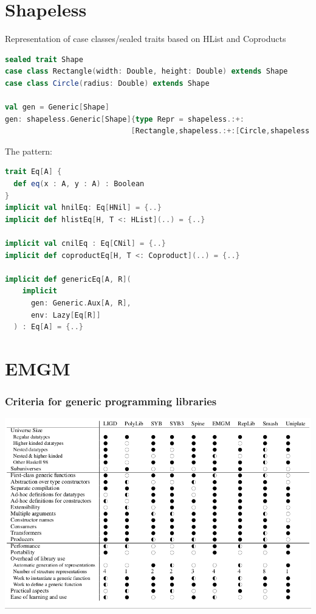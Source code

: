 \documentclass[10pt]{beamer}
\begin{document}
\section{Shapeless}
\begin{frame}[fragile]
 Representation of case classes/sealed traits based on HList and Coproducts
\begin{lstlisting}[language=Scala,basicstyle=\ttfamily\scriptsize]
sealed trait Shape
case class Rectangle(width: Double, height: Double) extends Shape
case class Circle(radius: Double) extends Shape

val gen = Generic[Shape]
gen: shapeless.Generic[Shape]{type Repr = shapeless.:+:
                             [Rectangle,shapeless.:+:[Circle,shapeless.CNil]]}
\end{lstlisting}
The pattern:
\begin{lstlisting}[language=Scala,basicstyle=\ttfamily\scriptsize]
trait Eq[A] {
  def eq(x : A, y : A) : Boolean
}
implicit val hnilEq: Eq[HNil] = {..}
implicit def hlistEq[H, T <: HList](..) = {..}

implicit val cnilEq : Eq[CNil] = {..}
implicit def coproductEq[H, T <: Coproduct](..) = {..}

implicit def genericEq[A, R](
    implicit
      gen: Generic.Aux[A, R],
      env: Lazy[Eq[R]]
  ) : Eq[A] = {..}
\end{lstlisting}

\end{frame}

\section{EMGM}
\begin{frame}
\frametitle{Criteria for generic programming libraries}
\begin{center}
\includegraphics[scale=0.35]{Images/Comparisons.png}
\end{center}
\end{frame}
\end{document}

